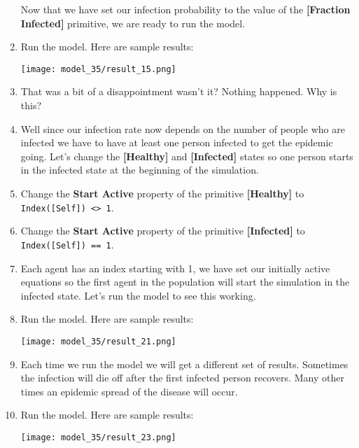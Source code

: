\documentclass[]{memoir}
\makeatletter
\def\maxwidth{\ifdim\Gin@nat@width>\linewidth\linewidth
\else\Gin@nat@width\fi}
\let\Oldincludegraphics\includegraphics
\renewcommand{\includegraphics}[1]{\Oldincludegraphics[width=\maxwidth]{#1}}
\newcommand{\p}[1]{\textbf{{[}#1{]}}}
\newcommand{\e}[1]{\texttt{#1}}
\renewcommand{\a}[1]{\textbf{#1}}
\makeatother
\begin{document}
\begin{oframed}
\begin{enumerate}
Now that we have set our infection probability to the value of the \p{Fraction Infected} primitive, we are ready to run the model.


\item Run the model. Here are sample results:\par \begin{minipage}{\linewidth}  \centering \texttt{[image: model\_35/result\_15.png]}
\end{minipage}
\item 

That was a bit of a disappointment wasn't it? Nothing happened. Why is this?


\item 

Well since our infection rate now depends on the number of people who are infected we have to have at least one person infected to get the epidemic going. Let's change the \p{Healthy} and \p{Infected} states so one person starts in the infected state at the beginning of the simulation.


\item  Change the \a{Start Active} property of the primitive \p{Healthy} to \e{Index([Self]) <> 1}.
\item  Change the \a{Start Active} property of the primitive \p{Infected} to \e{Index([Self]) == 1}.
\item 

Each agent has an index starting with 1, we have set our initially active equations so the first agent in the population will start the simulation in the infected state. Let's run the model to see this working.


\item Run the model. Here are sample results:\par \begin{minipage}{\linewidth}  \centering \texttt{[image: model\_35/result\_21.png]}
\end{minipage}
\item 

Each time we run the model we will get a different set of results. Sometimes the infection will die off after the first infected person recovers. Many other times an epidemic spread of the disease will occur.


\item Run the model. Here are sample results:\par \begin{minipage}{\linewidth}  \centering \texttt{[image: model\_35/result\_23.png]}
\end{minipage}

\end{enumerate} \end{oframed}
\end{document}

